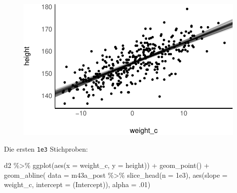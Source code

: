 \documentclass[
  a4paper,
  DIV=11]{scrreprt}
\newenvironment{Shaded}{\begin{snugshade}}{\end{snugshade}}
\newcommand{\AttributeTok}[1]{\textcolor[rgb]{0.40,0.45,0.13}{#1}}
\newcommand{\DecValTok}[1]{\textcolor[rgb]{0.68,0.00,0.00}{#1}}
\newcommand{\FloatTok}[1]{\textcolor[rgb]{0.68,0.00,0.00}{#1}}
\newcommand{\FunctionTok}[1]{\textcolor[rgb]{0.28,0.35,0.67}{#1}}
\newcommand{\NormalTok}[1]{\textcolor[rgb]{0.00,0.23,0.31}{#1}}
\newcommand{\SpecialCharTok}[1]{\textcolor[rgb]{0.37,0.37,0.37}{#1}}
\newcommand{\StringTok}[1]{\textcolor[rgb]{0.13,0.47,0.30}{#1}}
\theoremstyle{definition}
\theoremstyle{remark}
\begin{document}
\begin{figure}[H]

{\centering \includegraphics{./lineare-modelle_files/figure-pdf/Post-Regression-befragen-11-ersten-1000-1.pdf}

}

\end{figure}

Die ersten \texttt{1e3} Stichproben:

\begin{Shaded}
\begin{Highlighting}[]
\NormalTok{d2 }\SpecialCharTok{\%\textgreater{}\%} 
  \FunctionTok{ggplot}\NormalTok{(}\FunctionTok{aes}\NormalTok{(}\AttributeTok{x =}\NormalTok{ weight\_c, }
             \AttributeTok{y =}\NormalTok{ height)) }\SpecialCharTok{+}
  \FunctionTok{geom\_point}\NormalTok{() }\SpecialCharTok{+}
  \FunctionTok{geom\_abline}\NormalTok{(}
    \AttributeTok{data =}\NormalTok{ m43a\_post }\SpecialCharTok{\%\textgreater{}\%} 
      \FunctionTok{slice\_head}\NormalTok{(}\AttributeTok{n =} \FloatTok{1e3}\NormalTok{),}
     \FunctionTok{aes}\NormalTok{(}\AttributeTok{slope =}\NormalTok{ weight\_c,}
        \AttributeTok{intercept =} \StringTok{\textasciigrave{}}\AttributeTok{(Intercept)}\StringTok{\textasciigrave{}}\NormalTok{),}
    \AttributeTok{alpha =}\NormalTok{ .}\DecValTok{01}\NormalTok{)}
\end{Highlighting}
\end{Shaded}
\end{document}
